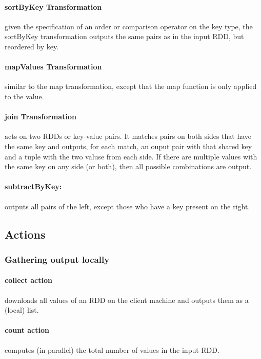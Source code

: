\paragraph{sortByKey Transformation} given the specification of an order or comparison operator on the key type, the sortByKey transformation outputs the same pairs as in the input RDD, but reordered by key.

\paragraph{mapValues Transformation} similar to the map transformation, except that the map function is only applied to the value.

\paragraph{join Transformation} acts on two RDDs or key-value pairs. It matches pairs on both sides that have the same key and outputs, for each match, an ouput pair with that shared key and a tuple with the two valuse from each side. If there are multiple values with the same key on any side (or both), then all possible combinations are output.

\paragraph{subtractByKey:} outputs all pairs of the left, except those who have a key present on the right.


\subsection{Actions}

\subsubsection{Gathering output locally}

\paragraph{collect action} downloads all values of an RDD on the client machine and outputs them as a (local) list.

\paragraph{count action} computes (in parallel) the total number of values in the input RDD.

